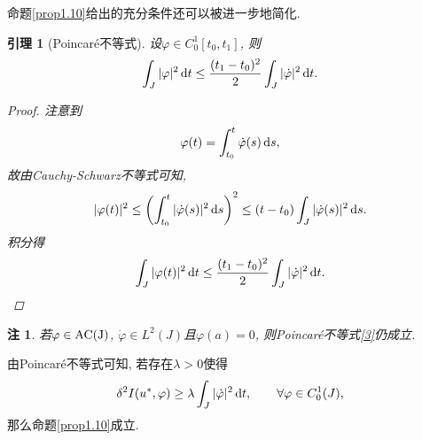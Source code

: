 \documentclass[12pt,a4paper]{article}
\newtheorem{lemma}[theorem]{引理}
\newtheorem{remark}[theorem]{注}
\begin{document}
命题\ref{prop1.10}给出的充分条件还可以被进一步地简化.

\begin{lemma}[Poincaré不等式]\label{lma1.12}
    设$\varphi \in C_0^1[t_0, t_1]$, 则 
    \begin{equation}\label{3}
        \int_J|\varphi|^2 \,{\rm d}t \leq \frac{(t_1 - t_0)^2}{2}\int_J|\dot\varphi|^2 \,{\rm d}t.
    \end{equation}
    \begin{proof}
        注意到
        \begin{equation*}
            \varphi(t) = \int_{t_0}^t\dot\varphi(s) \,{\rm d}s,
        \end{equation*}
        故由Cauchy-Schwarz不等式可知, 
        \begin{equation*}
            |\varphi(t)|^2 \leq \left(\int_{t_0}^t|\dot\varphi(s)|^2 \,{\rm d}s\right)^2 \leq (t - t_0)\int_J|\dot\varphi(s)|^2 \,{\rm d}s.
        \end{equation*}
        积分得 
        \begin{equation*}
            \int_J|\varphi(t)|^2 \,{\rm d}t \leq \frac{(t_1 - t_0)^2}{2}\int_J|\dot\varphi|^2 \,{\rm d}t.
        \end{equation*}
    \end{proof}
\end{lemma}

\begin{remark}
    若$\varphi \in {\rm AC(J)}$, $\dot\varphi \in L^2(J)$且$\varphi(a) = 0$, 则Poincaré不等式\eqref{3}仍成立.
\end{remark}

由Poincaré不等式可知, 若存在$\lambda > 0$使得
\begin{equation*}
    \delta^2I(u^*, \varphi) \geq \lambda\int_J|\dot\varphi|^2 \,{\rm d}t, \qquad \forall \varphi \in C_0^1(J),
\end{equation*}
那么命题\ref{prop1.10}成立.
\end{document}
